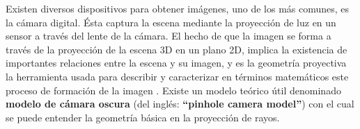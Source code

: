 Existen diversos dispositivos para obtener imágenes, uno de los más comunes, es la cámara digital. Ésta captura la escena mediante la proyección de luz en un sensor a través del lente de la cámara. El hecho de que la imagen se forma a través de la proyección de la escena 3D en un plano 2D, implica la existencia de importantes relaciones entre la escena y su imagen, y es la geometría proyectiva la herramienta usada para describir y caracterizar en términos matemáticos este proceso de formación de la imagen \cite{citeulike:3484001, citeulike:9456628}.
Existe un modelo teórico útil denominado \textbf{modelo de cámara oscura} (del inglés: \textbf{``pinhole camera model''}) \cite{Hartley2004, citeulike:3484001} con el cual se puede entender la geometría básica en la proyección de rayos. %
% 
